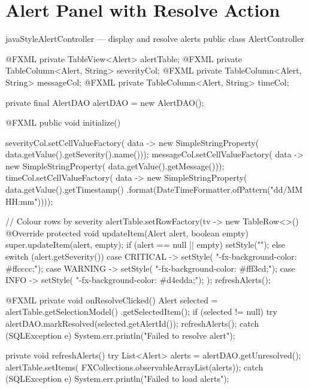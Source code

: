 \documentclass[12pt, a4paper]{report}
\begin{document}
\section{Alert Panel with Resolve Action}

\begin{codeblock}{javaStyle}{AlertController --- display and resolve alerts}
public class AlertController {
    @FXML private TableView<Alert> alertTable;
    @FXML private TableColumn<Alert, String> severityCol;
    @FXML private TableColumn<Alert, String> messageCol;
    @FXML private TableColumn<Alert, String> timeCol;

    private final AlertDAO alertDAO = new AlertDAO();

    @FXML
    public void initialize() {
        severityCol.setCellValueFactory(
            data -> new SimpleStringProperty(
                data.getValue().getSeverity().name()));
        messageCol.setCellValueFactory(
            data -> new SimpleStringProperty(
                data.getValue().getMessage()));
        timeCol.setCellValueFactory(
            data -> new SimpleStringProperty(
                data.getValue().getTimestamp()
                    .format(DateTimeFormatter.ofPattern("dd/MM HH:mm"))));

        // Colour rows by severity
        alertTable.setRowFactory(tv -> new TableRow<>() {
            @Override
            protected void updateItem(Alert alert, boolean empty) {
                super.updateItem(alert, empty);
                if (alert == null || empty) {
                    setStyle("");
                } else {
                    switch (alert.getSeverity()) {
                        case CRITICAL -> setStyle(
                            "-fx-background-color: #ffcccc;");
                        case WARNING  -> setStyle(
                            "-fx-background-color: #fff3cd;");
                        case INFO     -> setStyle(
                            "-fx-background-color: #d4edda;");
                    }
                }
            }
        });
        refreshAlerts();
    }

    @FXML
    private void onResolveClicked() {
        Alert selected = alertTable.getSelectionModel()
                                   .getSelectedItem();
        if (selected != null) {
            try {
                alertDAO.markResolved(selected.getAlertId());
                refreshAlerts();
            } catch (SQLException e) {
                System.err.println("Failed to resolve alert");
            }
        }
    }

    private void refreshAlerts() {
        try {
            List<Alert> alerts = alertDAO.getUnresolved();
            alertTable.setItems(
                FXCollections.observableArrayList(alerts));
        } catch (SQLException e) {
            System.err.println("Failed to load alerts");
        }
    }
}
\end{codeblock}
\end{document}
